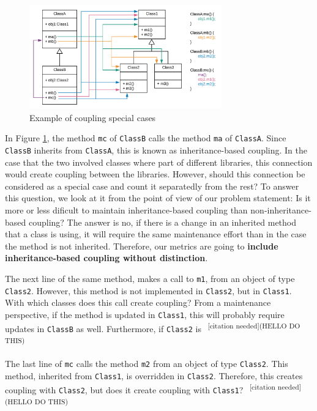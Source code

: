 \documentclass[a4paper]{article}
\newcommand{\cn}[1]{\textsuperscript{\color{red} ~[citation needed](#1)~}}
\begin{document}
\begin{figure}[ht]
\begin{center}
\includegraphics[height=4.5cm]{img/specialcases.png}
\caption{Example of coupling special cases}
\label{fig:specialcases}
\end{center}
\end{figure}

In Figure \ref{fig:specialcases}, the method \texttt{mc} of \texttt{ClassB} calls the method \texttt{ma} of \texttt{ClassA}. Since \texttt{ClassB} inherits from \texttt{ClassA}, this is known as inheritance-based coupling. In the case that the two involved classes where part of different libraries, this connection would create coupling between the libraries. However, should this connection be considered as a special case and count it separatedly from the rest? To answer this question, we look at it from the point of view of our problem statement: Is it more or less dificult to maintain inheritance-based coupling than non-inheritance-based coupling? The answer is no, if there is a change in an inherited method that a class is using, it will require the same maintenance effort than in the case the method is not inherited. Therefore, our metrics are going to \textbf{include inheritance-based coupling without distinction}.

The next line of the same method, makes a call to \texttt{m1}, from an object of type \texttt{Class2}. However, this method is not implemented in \texttt{Class2}, but in \texttt{Class1}. With which classes does this call create coupling? From a maintenance perspective, if the method is updated in \texttt{Class1}, this will probably require updates in \texttt{ClassB} as well. Furthermore, if \texttt{Class2} is \cn{HELLO DO THIS}

The last line of \texttt{mc} calls the method \texttt{m2} from an object of type \texttt{Class2}. This method, inherited from \texttt{Class1}, is overridden in \texttt{Class2}. Therefore, this creates coupling with \texttt{Class2}, but does it create coupling with \texttt{Class1}? \cn{HELLO DO THIS}
\end{document}
